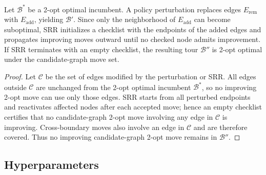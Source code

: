 \documentclass[journal]{IEEEtai}
\begin{document}
Let $\mathcal{B}^*$ be a 2-opt optimal incumbent. A policy perturbation replaces edges $E_{\mathrm{rem}}$ with $E_{\mathrm{add}}$, yielding $\mathcal{B}'$. Since only the neighborhood of $E_{\mathrm{add}}$ can become suboptimal, SRR initializes a checklist with the endpoints of the added edges and propagates improving moves outward until no checked node admits improvement. If SRR terminates with an empty checklist, the resulting tour $\mathcal{B}''$ is 2-opt optimal under the candidate-graph move set.

\begin{proof}
Let $\mathcal{C}$ be the set of edges modified by the perturbation or SRR\@. All edges outside $\mathcal{C}$ are unchanged from the 2-opt optimal incumbent $\mathcal{B}^*$, so no improving 2-opt move can use only those edges. SRR starts from all perturbed endpoints and reactivates affected nodes after each accepted move; hence an empty checklist certifies that no candidate-graph 2-opt move involving any edge in $\mathcal{C}$ is improving. Cross-boundary moves also involve an edge in $\mathcal{C}$ and are therefore covered. Thus no improving candidate-graph 2-opt move remains in $\mathcal{B}''$.
\end{proof}

\subsection{Hyperparameters}
\label{app:repro}
\end{document}
